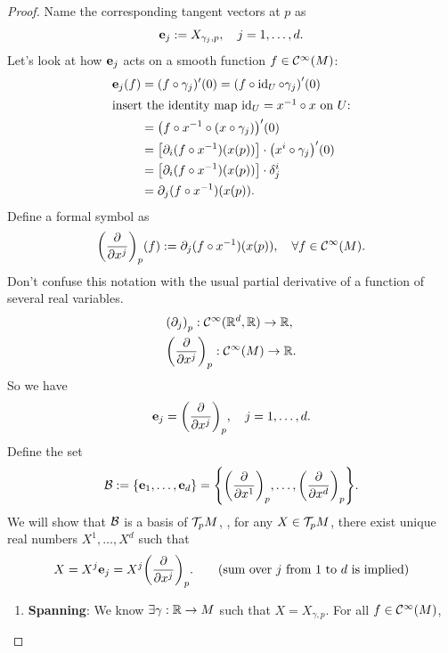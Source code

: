 \begin{proof}
	Name the corresponding tangent vectors at \(p\) as
	\begin{equation}
		\vb{e}_j := X_{\gamma_j, p}, \quad j = 1, \ldots, d.
	\end{equation}
	Let's look at how \(\vb{e}_j\) acts on a smooth function \(f \in \mathcal C^\infty(M)\):
	\begin{align*}
		\vb{e}_j(f) & = (f \circ \gamma_j)'(0) = \qty(f \circ \operatorname{id}_U \circ \gamma_j)'(0)            \\
		\shortintertext{insert the identity map \(\operatorname{id}_U = x^{-1} \circ x\) on \(U\):}
		            & = \qty(f \circ x^{-1} \circ (x \circ \gamma_j))'(0)                          \\
		            & = \qty[\partial_i (f \circ x^{-1})(x(p))] \cdot \qty(x^i \circ \gamma_j)'(0) \\
		            & = \qty[\partial_i (f \circ x^{-1})(x(p))] \cdot \delta_j^i                   \\
		            & = \partial_j (f \circ x^{-1})(x(p)).
	\end{align*}
	Define a formal symbol as
	\begin{equation}
		\qty(\pdv{x^j})_p (f) := \partial_j (f \circ x^{-1})(x(p)), \quad \forall f \in \mathcal C^\infty(M).
	\end{equation}
	Don't confuse this notation with the usual partial derivative of a function of several real variables.
	\begin{align*}
		 & \qty(\partial_j)_p: \mathcal C^\infty(\mathbb R^d, \mathbb R) \to \mathbb R, \\
		 & \qty(\pdv{x^j})_p: \mathcal C^\infty(M) \to \mathbb R.
	\end{align*}
	So we have
	\begin{equation}
		\vb{e}_j = \qty(\pdv{x^j})_p, \quad j = 1, \ldots, d.
	\end{equation}
	Define the set
	\begin{equation}
		\mathcal B := \qty{\vb{e}_1, \ldots, \vb{e}_d} = \qty{\qty(\pdv{x^1})_p, \ldots, \qty(\pdv{x^d})_p}.
	\end{equation}
	We will show that \(\mathcal B\) is a basis of \(\mathcal T_p M\), \ie, for any \(X \in \mathcal T_p M\), there exist unique real numbers \(X^1, \ldots, X^d\) such that
	\begin{equation}
		X = X^j \vb{e}_j = X^j \qty(\pdv{x^j})_p. \qquad \text{(sum over \(j\) from \(1\) to \(d\) is implied)}
	\end{equation}
	\begin{enumerate}
		\item \textbf{Spanning}: We know \(\exists \gamma: \mathbb R \to M\) such that \(X = X_{\gamma, p}\). For all \(f \in \mathcal C^\infty(M)\),

\end{enumerate}
\end{proof}
